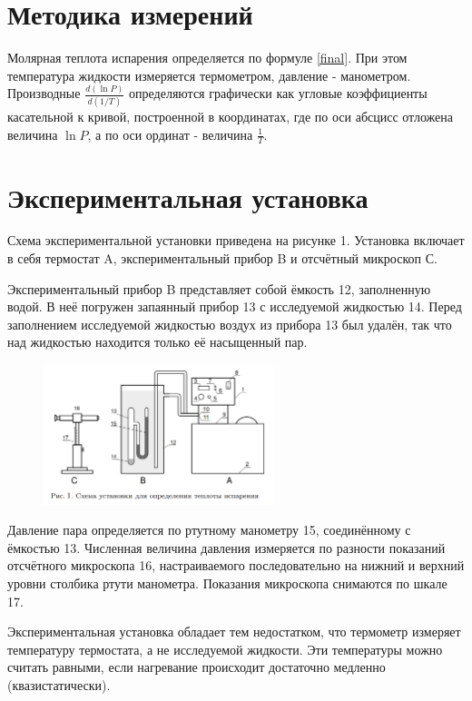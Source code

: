 \documentclass[15pt,a5paper,reqno]{article}
\begin{document}
\section{Методика измерений}

    Молярная теплота испарения определяется по формуле \eqref{final}. При этом температура жидкости измеряется термометром, давление - манометром. Производные $\frac{d(\ln{P})}{d(1/T)}$ определяются графически как угловые коэффициенты касательной к кривой, построенной в координатах, где по оси абсцисс отложена величина $\ln{P}$, а по оси ординат - величина $\frac{1}{T}$.
    
\section{Экспериментальная установка}

    Схема экспериментальной установки приведена на рисунке 1. Установка включает в себя термостат A, экспериментальный прибор B и отсчётный микроскоп С.
    
    Экспериментальный прибор B представляет собой ёмкость 12, заполненную водой. В неё погружен запаянный прибор 13 с исследуемой жидкостью 14. Перед заполнением исследуемой жидкостью воздух из прибора 13 был удалён, так что над жидкостью находится только её насыщенный пар.
    
    \begin{figure}
        \includegraphics[width = 0.6\textwidth]{Рисунок 1.png}
    \end{figure}
    Давление пара определяется по ртутному манометру 15, соединённому с ёмкостью 13. Численная величина давления измеряется по разности показаний отсчётного микроскопа 16, настраиваемого последовательно на нижний и верхний уровни столбика ртути манометра. Показания микроскопа снимаются по шкале 17.
    
    Экспериментальная установка обладает тем недостатком, что термометр измеряет температуру термостата, а не исследуемой жидкости. Эти температуры можно считать равными, если нагревание происходит достаточно медленно (квазистатически).
    
\end{document}
